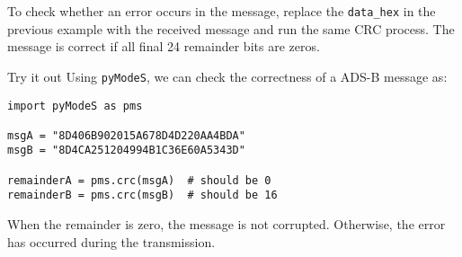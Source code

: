To check whether an error occurs in the message, replace the \texttt{data\_hex} in the previous example with the received message and run the same CRC process. The message is correct if all final 24 remainder bits are zeros.

\begin{notebox}{Try it out}
Using \texttt{pyModeS}, we can check the correctness of a ADS-B message as: 

\begin{verbatim}
import pyModeS as pms

msgA = "8D406B902015A678D4D220AA4BDA"
msgB = "8D4CA251204994B1C36E60A5343D"

remainderA = pms.crc(msgA)  # should be 0
remainderB = pms.crc(msgB)  # should be 16
\end{verbatim}

When the remainder is zero, the message is not corrupted. Otherwise, the error has occurred during the transmission.

\end{notebox}